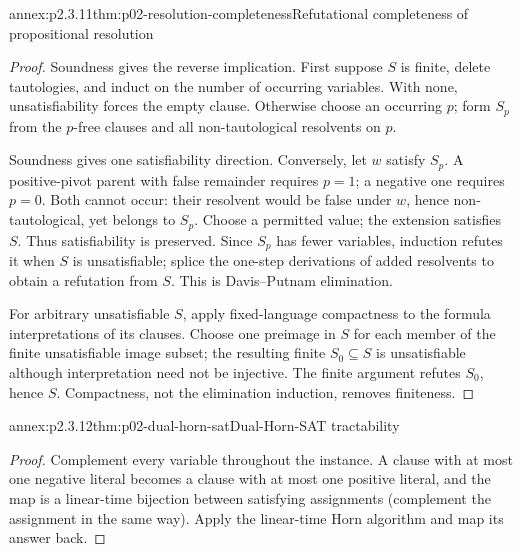 \begin{annexitem}{annex:p2.3.11}{thm:p02-resolution-completeness}{Refutational completeness of propositional resolution}
\begin{proof}
Soundness gives the reverse implication.  First suppose \(S\) is finite,
delete tautologies, and induct on the number of occurring variables.  With
none, unsatisfiability forces the empty clause.  Otherwise choose an occurring
\(p\); form \(S_p\) from the \(p\)-free clauses and all non-tautological
resolvents on \(p\).

Soundness gives one satisfiability direction.  Conversely, let \(w\) satisfy
\(S_p\).  A positive-pivot parent with false remainder requires \(p=1\); a
negative one requires \(p=0\).  Both cannot occur: their resolvent would be
false under \(w\), hence non-tautological, yet belongs to \(S_p\).  Choose a
permitted value; the extension satisfies \(S\).  Thus satisfiability is
preserved.  Since \(S_p\) has fewer variables, induction refutes it when
\(S\) is unsatisfiable; splice the one-step derivations of added resolvents to
obtain a refutation from \(S\).  This is Davis--Putnam elimination.

For arbitrary unsatisfiable \(S\), apply fixed-language compactness to the
formula interpretations of its clauses.  Choose one preimage in \(S\) for
each member of the finite unsatisfiable image subset; the resulting finite
\(S_0\subseteq S\) is unsatisfiable although interpretation need not be
injective.  The finite argument refutes \(S_0\), hence \(S\).  Compactness,
not the elimination induction, removes finiteness.
\end{proof}
\end{annexitem}

\begin{annexitem}{annex:p2.3.12}{thm:p02-dual-horn-sat}{Dual-Horn-SAT tractability}
\begin{proof}
Complement every variable throughout the instance.  A clause with at most one
negative literal becomes a clause with at most one positive literal, and the
map is a linear-time bijection between satisfying assignments (complement the
assignment in the same way).  Apply the linear-time Horn algorithm and map its
answer back.
\end{proof}
\end{annexitem}

